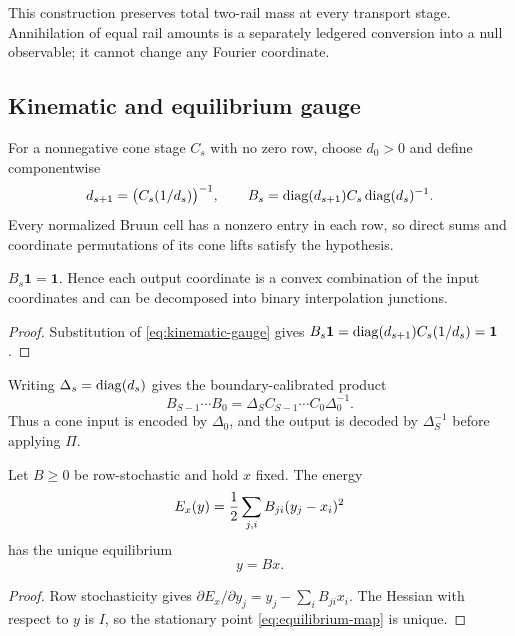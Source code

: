 This construction preserves total two-rail mass at every transport stage.
Annihilation of equal rail amounts is a separately ledgered conversion into a
null observable; it cannot change any Fourier coordinate.

\subsection{Kinematic and equilibrium gauge}

For a nonnegative cone stage $C_s$ with no zero row, choose $d_0>0$ and define
componentwise
\begin{equation}
 d_{s+1}=\bigl(C_s(1/d_s)\bigr)^{-1},
 \qquad
 B_s=\operatorname{diag}(d_{s+1})C_s\operatorname{diag}(d_s)^{-1}.
 \label{eq:kinematic-gauge}
\end{equation}
Every normalized Bruun cell has a nonzero entry in each row, so direct sums and
coordinate permutations of its cone lifts satisfy the hypothesis.

\begin{proposition}
$B_s\bm{1}=\bm{1}$.  Hence each output coordinate is a convex combination of the
input coordinates and can be decomposed into binary interpolation junctions.
\end{proposition}
\begin{proof}
Substitution of \eqref{eq:kinematic-gauge} gives
$B_s\bm{1}=\operatorname{diag}(d_{s+1})C_s(1/d_s)=\bm{1}$.
\end{proof}

Writing $\Delta_s=\operatorname{diag}(d_s)$ gives the boundary-calibrated product
\begin{equation}
 B_{S-1}\cdots B_0
 =\Delta_SC_{S-1}\cdots C_0\Delta_0^{-1}.
 \label{eq:kinematic-boundary-product}
\end{equation}
Thus a cone input is encoded by $\Delta_0$, and the output is decoded by
$\Delta_S^{-1}$ before applying $\Pi$.

\begin{theorem}
Let $B\ge0$ be row-stochastic and hold $x$ fixed.  The energy
\begin{equation}
 E_x(y)={1\over2}\sum_{j,i}B_{ji}(y_j-x_i)^2
 \label{eq:equilibrium-energy}
\end{equation}
has the unique equilibrium
\begin{equation}
 y=Bx.
 \label{eq:equilibrium-map}
\end{equation}
\end{theorem}
\begin{proof}
Row stochasticity gives
$\partial E_x/\partial y_j=y_j-\sum_iB_{ji}x_i$.  The Hessian with respect to
$y$ is $I$, so the stationary point \eqref{eq:equilibrium-map} is unique.
\end{proof}

